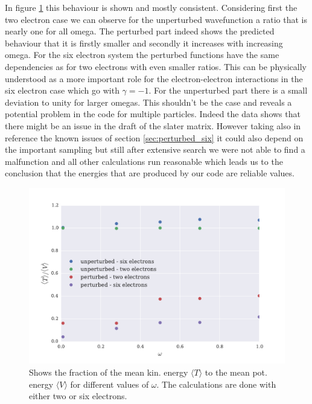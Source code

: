 In figure \ref{fig:virialtheorem} this behaviour is shown and mostly consistent. Considering first the two electron case we can observe for the unperturbed wavefunction a ratio that is nearly one for all omega. The perturbed part indeed shows the predicted behaviour that it is firstly smaller and secondly it increases with increasing omega. For the six electron system the perturbed functions have the same dependencies as for two electrons with even smaller ratios. This can be physically understood as a more important role for the electron-electron interactions in the six electron case which go with $\gamma = -1$. For the unperturbed part there is a small deviation to unity for larger omegas. This shouldn't be the case and reveals a potential problem in the code for multiple particles. Indeed the data shows that there might be an issue in the draft of the slater matrix. However taking also in reference the known issues of section \ref{sec:perturbed_six} it could also depend on the important sampling but still after extensive search we were not able to find a malfunction and all other calculations run reasonable which leads us to the conclusion that the energies that are produced by our code are reliable values.  
\begin{figure}[htbp]
    \centering
    \includegraphics[scale=0.7]{virialtheorem}
    \caption{Shows the fraction of the mean kin. energy $\langle T \rangle$ to the mean pot. energy $\langle V \rangle$ for different values of $\omega$. The calculations are done with either two or six electrons.}
    \label{fig:virialtheorem}
\end{figure}

